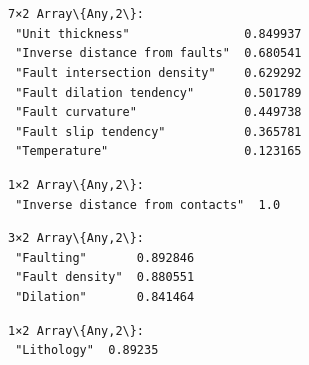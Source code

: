 \documentclass[11pt]{article}
\begin{document}
    \begin{center}
    \end{center}
    { \hspace*{\fill} \\}
    
    \begin{Verbatim}[commandchars=\\\{\}]

    \end{Verbatim}

    \begin{center}
    \end{center}
    { \hspace*{\fill} \\}
    
    \begin{Verbatim}[commandchars=\\\{\}]

    \end{Verbatim}

    
    \begin{Verbatim}[commandchars=\\\{\}]
7×2 Array\{Any,2\}:
 "Unit thickness"                0.849937
 "Inverse distance from faults"  0.680541
 "Fault intersection density"    0.629292
 "Fault dilation tendency"       0.501789
 "Fault curvature"               0.449738
 "Fault slip tendency"           0.365781
 "Temperature"                   0.123165
    \end{Verbatim}

    
    
    \begin{Verbatim}[commandchars=\\\{\}]
1×2 Array\{Any,2\}:
 "Inverse distance from contacts"  1.0
    \end{Verbatim}

    
    
    \begin{Verbatim}[commandchars=\\\{\}]
3×2 Array\{Any,2\}:
 "Faulting"       0.892846
 "Fault density"  0.880551
 "Dilation"       0.841464
    \end{Verbatim}

    
    
    \begin{Verbatim}[commandchars=\\\{\}]
1×2 Array\{Any,2\}:
 "Lithology"  0.89235
    \end{Verbatim}
\end{document}
